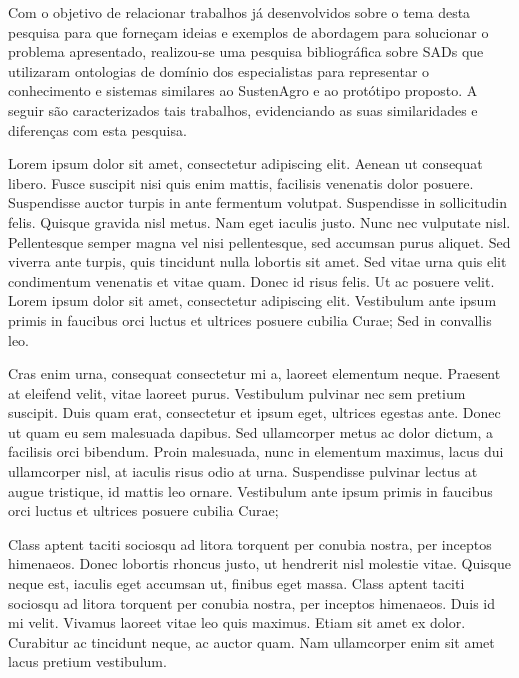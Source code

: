 Com o objetivo de relacionar trabalhos já desenvolvidos sobre o tema desta pesquisa para que forneçam ideias e exemplos de abordagem para solucionar o problema apresentado, realizou-se uma pesquisa bibliográfica sobre SADs que utilizaram ontologias de domínio dos especialistas para representar o conhecimento e sistemas similares ao SustenAgro e ao protótipo proposto. A seguir são caracterizados tais trabalhos, evidenciando as suas similaridades e diferenças com esta pesquisa.

% 
% 

Lorem ipsum dolor sit amet, consectetur adipiscing elit. Aenean ut consequat libero. Fusce suscipit nisi quis enim mattis, facilisis venenatis dolor posuere. Suspendisse auctor turpis in ante fermentum volutpat. Suspendisse in sollicitudin felis. Quisque gravida nisl metus. Nam eget iaculis justo. Nunc nec vulputate nisl. Pellentesque semper magna vel nisi pellentesque, sed accumsan purus aliquet. Sed viverra ante turpis, quis tincidunt nulla lobortis sit amet. Sed vitae urna quis elit condimentum venenatis et vitae quam. Donec id risus felis. Ut ac posuere velit. Lorem ipsum dolor sit amet, consectetur adipiscing elit. Vestibulum ante ipsum primis in faucibus orci luctus et ultrices posuere cubilia Curae; Sed in convallis leo.

Cras enim urna, consequat consectetur mi a, laoreet elementum neque. Praesent at eleifend velit, vitae laoreet purus. Vestibulum pulvinar nec sem pretium suscipit. Duis quam erat, consectetur et ipsum eget, ultrices egestas ante. Donec ut quam eu sem malesuada dapibus. Sed ullamcorper metus ac dolor dictum, a facilisis orci bibendum. Proin malesuada, nunc in elementum maximus, lacus dui ullamcorper nisl, at iaculis risus odio at urna. Suspendisse pulvinar lectus at augue tristique, id mattis leo ornare. Vestibulum ante ipsum primis in faucibus orci luctus et ultrices posuere cubilia Curae;

Class aptent taciti sociosqu ad litora torquent per conubia nostra, per inceptos himenaeos. Donec lobortis rhoncus justo, ut hendrerit nisl molestie vitae. Quisque neque est, iaculis eget accumsan ut, finibus eget massa. Class aptent taciti sociosqu ad litora torquent per conubia nostra, per inceptos himenaeos. Duis id mi velit. Vivamus laoreet vitae leo quis maximus. Etiam sit amet ex dolor. Curabitur ac tincidunt neque, ac auctor quam. Nam ullamcorper enim sit amet lacus pretium vestibulum.

